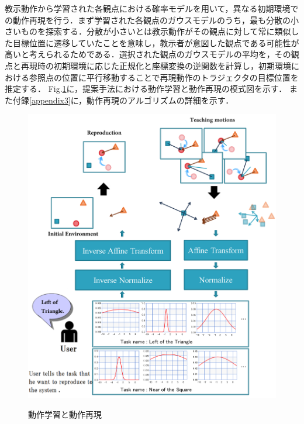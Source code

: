 教示動作から学習された各観点における確率モデルを用いて，異なる初期環境での動作再現を行う．まず学習された各観点のガウスモデルのうち，最も分散の小さいものを探索する．分散が小さいとは教示動作がその観点に対して常に類似した目標位置に遷移していたことを意味し，教示者が意図した観点である可能性が高いと考えられるためである．選択された観点のガウスモデルの平均を，その観点と再現時の初期環境に応じた正規化と座標変換の逆関数を計算し，初期環境における参照点の位置に平行移動することで再現動作のトラジェクタの目標位置を推定する．
Fig.\ref{figure:learning_and_reproduction_model}に，提案手法における動作学習と動作再現の模式図を示す．
また付録\ref{appendix3}に，動作再現のアルゴリズムの詳細を示す．
	\begin{figure}[h]
		\begin{center}
			\includegraphics[width=12cm]{chart9.png} \\ %
			\caption{動作学習と動作再現}
			\label{figure:learning_and_reproduction_model}
		\end{center}
	\end{figure}

